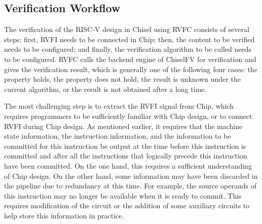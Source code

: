 \documentclass[conference]{IEEEtran}
\theoremstyle{definition}
\begin{document}
\subsection{Verification Workflow}
The verification of the RISC-V design in Chisel using RVFC consists of several steps: first, RVFI needs to be connected in Chip; then, the content to be verified needs to be configured; and finally, the verification algorithm to be called needs to be configured.
RVFC calls the backend engine of ChiselFV for verification and gives the verification result, which is generally one of the following four cases: the property holds, the property does not hold, the result is unknown under the current algorithm, or the result is not obtained after a long time.

The most challenging step is to extract the RVFI signal from Chip, which requires programmers to be sufficiently familiar with Chip design, or to connect RVFI during Chip design.
As mentioned earlier, it requires that the machine state information, the instruction information, and the information to be committed for this instruction be output at the time before this instruction is committed and after all the instructions that logically precede this instruction have been committed.
On the one hand, this requires a sufficient understanding of Chip design.
On the other hand, some information may have been discarded in the pipeline due to redundancy at this time.
For example, the source operands of this instruction may no longer be available when it is ready to commit.
This requires modification of the circuit or the addition of some auxiliary circuits to help store this information in practice.
\end{document}

